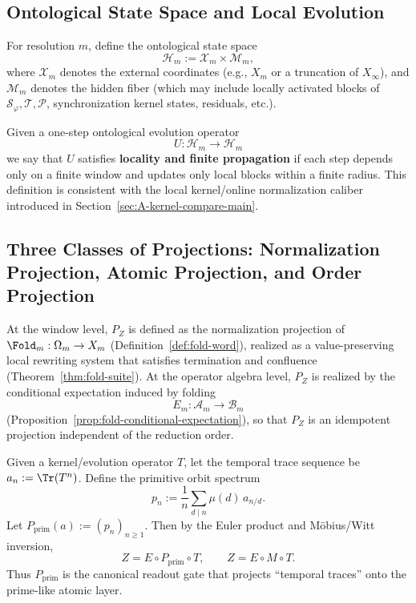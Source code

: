 \subsection{Ontological State Space and Local Evolution}\label{subsec:pom-state-evolution}
\begin{definition}\label{def:pom-state-space}
For resolution $m$, define the ontological state space
\[
\mathcal{H}_m:=\mathcal{X}_m\times \mathcal{M}_m,
\]
where $\mathcal{X}_m$ denotes the external coordinates (e.g., $X_m$ or a truncation of $X_\infty$), and $\mathcal{M}_m$ denotes the hidden fiber (which may include locally activated blocks of $\mathcal{S}_\varphi,\mathcal{T},\mathcal{P}$, synchronization kernel states, residuals, etc.).
\end{definition}

\begin{definition}\label{def:pom-locality}
Given a one-step ontological evolution operator
\[
U:\mathcal{H}_m\to\mathcal{H}_m
\]
we say that \(U\) satisfies \textbf{locality and finite propagation} if each step depends only on a finite window and updates only local blocks within a finite radius. This definition is consistent with the local kernel/online normalization caliber introduced in Section~\ref{sec:A-kernel-compare-main}.
\end{definition}

\subsection{Three Classes of Projections: Normalization Projection, Atomic Projection, and Order Projection}\label{subsec:pom-projections}
\begin{definition}\label{def:pom-proj-norm}
At the window level, $P_Z$ is defined as the normalization projection of $\Fold_m:\Omega_m\to X_m$ (Definition~\ref{def:fold-word}), realized as a value-preserving local rewriting system that satisfies termination and confluence (Theorem~\ref{thm:fold-suite}). At the operator algebra level, $P_Z$ is realized by the conditional expectation induced by folding
\[
E_m:\mathcal{A}_m\to\mathcal{B}_m
\]
(Proposition~\ref{prop:fold-conditional-expectation}), so that $P_Z$ is an idempotent projection independent of the reduction order.
\end{definition}

\begin{definition}\label{def:pom-proj-prim}
Given a kernel/evolution operator $T$, let the temporal trace sequence be $a_n:=\Tr(T^n)$. Define the primitive orbit spectrum
\[
p_n:=\frac{1}{n}\sum_{d\mid n}\mu(d)\,a_{n/d}.
\]
Let $P_{\mathrm{prim}}(a):=(p_n)_{n\ge 1}$. Then by the Euler product and M\"obius/Witt inversion,
\[
Z=E\circ P_{\mathrm{prim}}\circ T,
\qquad
Z=E\circ M\circ T.
\]
Thus $P_{\mathrm{prim}}$ is the canonical readout gate that projects ``temporal traces'' onto the prime-like atomic layer.
\end{definition}


